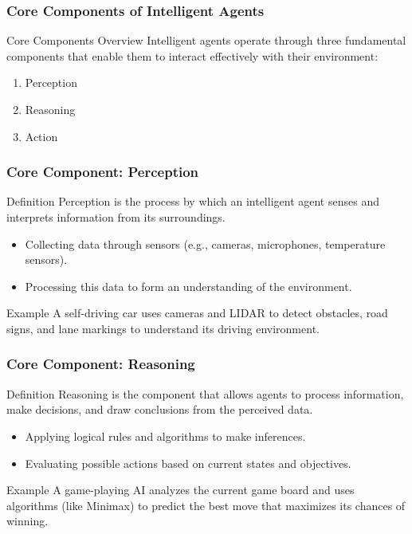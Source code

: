 \documentclass[aspectratio=169]{beamer}
\begin{document}
\begin{frame}[fragile]
  \frametitle{Core Components of Intelligent Agents}
  \begin{block}{Core Components Overview}
    Intelligent agents operate through three fundamental components that enable them to interact effectively with their environment:
    \begin{enumerate}
      \item Perception
      \item Reasoning
      \item Action
    \end{enumerate}
  \end{block}
\end{frame}

\begin{frame}[fragile]
  \frametitle{Core Component: Perception}
  \begin{block}{Definition}
    Perception is the process by which an intelligent agent senses and interprets information from its surroundings.
  \end{block}
  
  \begin{itemize}
    \item Collecting data through sensors (e.g., cameras, microphones, temperature sensors).
    \item Processing this data to form an understanding of the environment.
  \end{itemize}
  
  \begin{block}{Example}
    A self-driving car uses cameras and LIDAR to detect obstacles, road signs, and lane markings to understand its driving environment.
  \end{block}
\end{frame}

\begin{frame}[fragile]
  \frametitle{Core Component: Reasoning}
  \begin{block}{Definition}
    Reasoning is the component that allows agents to process information, make decisions, and draw conclusions from the perceived data.
  \end{block}
  
  \begin{itemize}
    \item Applying logical rules and algorithms to make inferences.
    \item Evaluating possible actions based on current states and objectives.
  \end{itemize}
  
  \begin{block}{Example}
    A game-playing AI analyzes the current game board and uses algorithms (like Minimax) to predict the best move that maximizes its chances of winning.
  \end{block}
\end{frame}
\end{document}

